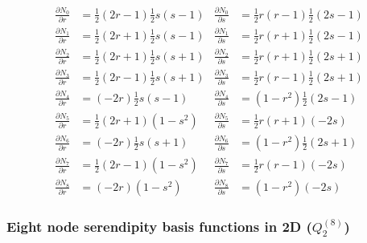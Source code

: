 \begin{mdframed}[backgroundcolor=blue!5]
\begin{align}
\frac{\partial N_0}{\partial r}&= \frac{1}{2}(2r-1)  \frac{1}{2}s(s-1) & 
\frac{\partial N_0}{\partial s}&= \frac{1}{2}r(r-1)  \frac{1}{2}(2s-1)\nonumber\\
\frac{\partial N_1}{\partial r}&= \frac{1}{2}(2r+1)  \frac{1}{2}s(s-1) &
\frac{\partial N_1}{\partial s}&= \frac{1}{2}r(r+1)  \frac{1}{2}(2s-1)\nonumber\\
\frac{\partial N_2}{\partial r}&= \frac{1}{2}(2r+1)  \frac{1}{2}s(s+1) &
\frac{\partial N_2}{\partial s}&= \frac{1}{2}r(r+1)  \frac{1}{2}(2s+1)\nonumber\\
\frac{\partial N_3}{\partial r}&= \frac{1}{2}(2r-1)  \frac{1}{2}s(s+1) &
\frac{\partial N_3}{\partial s}&= \frac{1}{2}r(r-1)  \frac{1}{2}(2s+1)\nonumber\\
\frac{\partial N_4}{\partial r}&=       (-2r)  \frac{1}{2}s(s-1) &
\frac{\partial N_4}{\partial s}&=     (1-r^2)  \frac{1}{2}(2s-1)\nonumber\\
\frac{\partial N_5}{\partial r}&= \frac{1}{2}(2r+1)     (1-s^2)&
\frac{\partial N_5}{\partial s}&= \frac{1}{2}r(r+1)        (-2s)\nonumber\\
\frac{\partial N_6}{\partial r}&=       (-2r)  \frac{1}{2}s(s+1)&
\frac{\partial N_6}{\partial s}&=     (1-r^2)  \frac{1}{2}(2s+1)\nonumber\\
\frac{\partial N_7}{\partial r}&= \frac{1}{2}(2r-1)     (1-s^2)&
\frac{\partial N_7}{\partial s}&= \frac{1}{2}r(r-1)        (-2s)\nonumber\\
\frac{\partial N_8}{\partial r}&=       (-2r)     (1-s^2)&
\frac{\partial N_8}{\partial s}&=     (1-r^2)        (-2s)\nonumber
\end{align}
\end{mdframed}

\subsubsection{Eight node serendipity basis functions in 2D ($Q_2^{(8)}$)}

